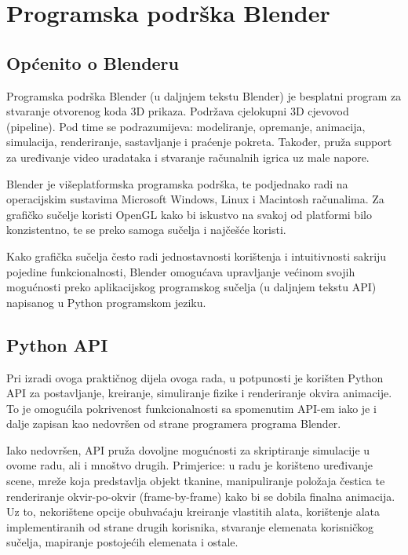 \chapter{Programska podrška Blender}

\section{Općenito o Blenderu}

Programska podrška Blender (u daljnjem tekstu Blender) je besplatni program za stvaranje otvorenog koda 3D prikaza. Podržava cjelokupni 3D cjevovod (pipeline). Pod time se podrazumijeva: modeliranje, opremanje, animacija, simulacija, renderiranje, sastavljanje i praćenje pokreta. Također, pruža support za uređivanje video uradataka i stvaranje računalnih igrica uz male napore. 

Blender je višeplatformska programska podrška, te podjednako radi na operacijskim sustavima Microsoft Windows, Linux i Macintosh računalima. Za grafičko sučelje koristi OpenGL kako bi iskustvo na svakoj od platformi bilo konzistentno, te se preko samoga sučelja i najčešće koristi. 

Kako grafička sučelja često radi jednostavnosti korištenja i intuitivnosti sakriju pojedine funkcionalnosti, Blender omogućava upravljanje većinom svojih mogućnosti preko aplikacijskog programskog sučelja (u daljnjem tekstu API) napisanog u Python programskom jeziku.

\section{Python API}

Pri izradi ovoga praktičnog dijela ovoga rada, u potpunosti je korišten Python API za postavljanje, kreiranje, simuliranje fizike i renderiranje okvira animacije. To je omogućila pokrivenost funkcionalnosti sa spomenutim API-em iako je i dalje zapisan kao nedovršen od strane programera programa Blender. 

Iako nedovršen, API pruža dovoljne mogućnosti za skriptiranje simulacije u ovome radu, ali i mnoštvo drugih. Primjerice: u radu je korišteno uređivanje scene, mreže koja predstavlja objekt tkanine, manipuliranje položaja čestica te renderiranje okvir-po-okvir (frame-by-frame) kako bi se dobila finalna animacija. Uz to, nekorištene opcije obuhvaćaju kreiranje vlastitih alata, korištenje alata implementiranih od strane drugih korisnika, stvaranje elemenata korisničkog sučelja, mapiranje postojećih elemenata i ostale.

